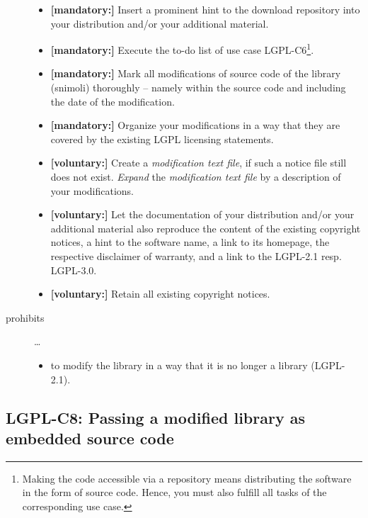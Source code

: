 \begin{description}
\begin{itemize}
  \item \textbf{[mandatory:]} Insert a prominent hint to the download repository
  into your distribution and/or your additional material.
  
  \item \textbf{[mandatory:]} Execute the to-do list of use case LGPL-C6\footnote{
  Making the code accessible via a repository means distributing the software in
  the form of source code. Hence, you must also fulfill all tasks of the
  corresponding use case.}.

  \item \textbf{[mandatory:]} Mark all modifications of source code of the
  library (snimoli) thoroughly -- namely within the source code and including
  the date of the modification.
  
  \item \textbf{[mandatory:]} Organize your modifications in a way that they are
  covered by the existing LGPL licensing statements.

  \item \textbf{[voluntary:]} Create a \emph{modification text file}, if such a
  notice file still does not exist. \emph{Expand} the \emph{modification text
  file} by a description of your modifications.

  \item \textbf{[voluntary:]} Let the documentation of your distribution and/or
  your additional material also reproduce the content of the existing
  copyright notices, a hint to the software name, a link to its homepage,
  the respective disclaimer of warranty, and a link to the LGPL-2.1 resp.
  LGPL-3.0.
  
  \item \textbf{[voluntary:]} Retain all existing copyright notices. 
  
\end{itemize}

\item[prohibits] \ldots
\begin{itemize}
  \item to modify the library in a way that it is no longer a library
  (LGPL-2.1).
\end{itemize}

\end{description}

\subsection{LGPL-C8: Passing a modified library as embedded source code}
\label{OSUC-10S-LGPL}

